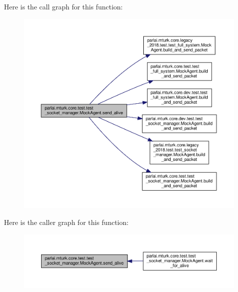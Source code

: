 Here is the call graph for this function\+:
\nopagebreak
\begin{figure}[H]
\begin{center}
\leavevmode
\includegraphics[width=350pt]{classparlai_1_1mturk_1_1core_1_1test_1_1test__socket__manager_1_1MockAgent_adb451acb10da3f0da1537de776ae767a_cgraph}
\end{center}
\end{figure}
Here is the caller graph for this function\+:
\nopagebreak
\begin{figure}[H]
\begin{center}
\leavevmode
\includegraphics[width=350pt]{classparlai_1_1mturk_1_1core_1_1test_1_1test__socket__manager_1_1MockAgent_adb451acb10da3f0da1537de776ae767a_icgraph}
\end{center}
\end{figure}
\mbox{\label{classparlai_1_1mturk_1_1core_1_1test_1_1test__socket__manager_1_1MockAgent_ad0ffb0ccd7e4ea967910e322aa698537}} 
